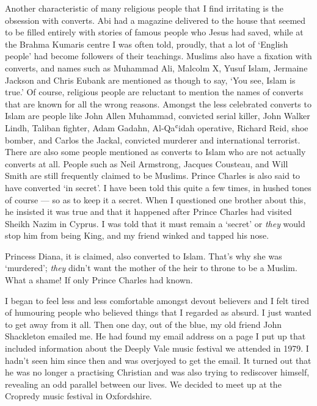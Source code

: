 \documentclass[12pt]{memoir}
\def\`{ʿ} %
\newcommand{\cor}[2]{#2} %
\def\–{-\hskip0pt}
\begin{document}
Another characteristic of many religious people
that I find irritating is the obsession with converts.
Abi had a magazine delivered to the house that seemed to be filled entirely
with stories of famous people who Jesus had saved,
while at the Brahma Kumaris centre I was often told, proudly,
that a lot of ‘English people’ had become followers of their teachings.
Muslims also have a fixation with converts, and names such as Muhammad Ali,
Malcolm X, Yusuf Islam, Jermaine Jackson and Chris Eubank
are mentioned as though to say, ‘You see, Islam is true.’
Of course, religious people are reluctant to mention
the names of converts that are known for all the wrong reasons.
Amongst the less celebrated converts to Islam are people
like John Allen Muhammad, convicted serial killer,
John Walker Lindh, Taliban fighter, Adam Gadahn,
Al\–Qa\`idah operative, Richard Reid, shoe bomber,
and Carlos the Jackal, convicted murderer and international terrorist.
There are also some people mentioned as converts to Islam
who are not actually converts at all.
People such as Neil Armstrong, Jacques Cousteau, and Will Smith
are still frequently claimed to be Muslims.
Prince Charles is also said to have converted ‘in secret’.
I have been told this quite a few times, in hushed tones of course —
so as to keep it a secret.
When I questioned one brother about this, he insisted it was true and that
it happened after Prince Charles had visited Sheikh Nazim in Cyprus.
I was told that it must remain a ‘secret’ or \emph{they}
would stop him from being King, and my friend winked and tapped his nose.

Princess Diana, it is claimed, also converted to Islam.
That’s why she was ‘murdered’;
\emph{they} didn’t want the mother of the heir to throne to be a Muslim.
What a shame! If only Prince Charles had known.

I began to feel less and less comfortable amongst devout believers
and I felt tired of humouring people who believed things
that I regarded as absurd.
I just wanted to get away from it all.
Then one day, out of the blue,
my old friend John \cor{Shackelton}{Shackleton} emailed me.
He had found my email address on a page I put up that included information
about the Deeply Vale music festival we attended in 1979.
I hadn’t seen him since then and was overjoyed to get the email.
It turned out that he was no longer a practising Christian
and was also trying to re\cor{\–}{}discover himself,
revealing an odd parallel between our lives.
We decided to meet up at the Cropredy music festival in Oxfordshire.
\end{document}
